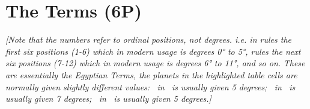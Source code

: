\section{The Terms (6P)}

\textit{[Note that the numbers refer to ordinal positions, not degrees. i.e. \Jupiter\xspace in \Aries rules the first six positions (1-6) which in modern usage is  degrees 0° to 5°, \Venus\xspace rules the next six positions (7-12) which in modern usage is degrees 6° to 11°, and so on. }
\textit{These are essentially the Egyptian Terms, the planets in the highlighted table cells are normally given slightly different values: \Saturn\, in \Taurus\, is usually given 5 degrees; \Jupiter\, in \Libra\, is usually given 7 degrees; \Mars\, in \Aquarius\, is usually given 5 degrees.]}

